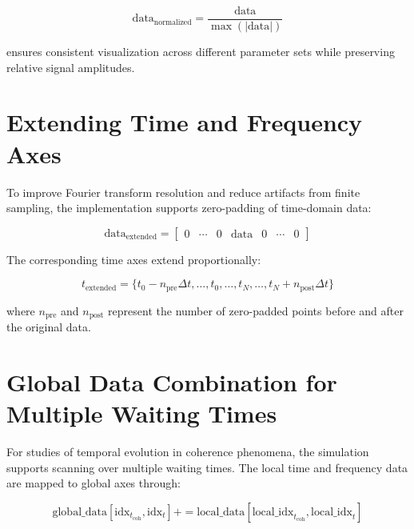 \begin{equation}
	\label{eq:data_normalization}
	\text{data}_{\text{normalized}} = \frac{\text{data}}{\max(|\text{data}|)}
\end{equation}

\noindent
ensures consistent visualization across different parameter sets while preserving relative signal amplitudes.

\section{Extending Time and Frequency Axes}
\label{sec:extending_axes}

\noindent
To improve Fourier transform resolution and reduce artifacts from finite sampling, the implementation supports zero-padding of time-domain data:

\begin{equation}
	\label{eq:zero_padding_matrix}
	\text{data}_{\text{extended}} = \begin{bmatrix}
		0 & \cdots & 0 & \text{data} & 0 & \cdots & 0
	\end{bmatrix}
\end{equation}

\noindent
The corresponding time axes extend proportionally:

\begin{equation}
	\label{eq:extended_time_axis}
	t_{\text{extended}} = \{t_0 - n_{\text{pre}} \Delta t, \ldots, t_0, \ldots, t_N, \ldots, t_N + n_{\text{post}} \Delta t\}
\end{equation}

\noindent
where $n_{\text{pre}}$ and $n_{\text{post}}$ represent the number of zero-padded points before and after the original data.

\section{Global Data Combination for Multiple Waiting Times}
\label{sec:global_data_combination}

\noindent
For studies of temporal evolution in coherence phenomena, the simulation supports scanning over multiple waiting times. The local time and frequency data are mapped to global axes through:

\begin{equation}
	\label{eq:global_mapping_corrected}
	\mathrm{global\_data}[\mathrm{idx}_{t_{\mathrm{coh}}}, \mathrm{idx}_{t}] += \mathrm{local\_data}[\mathrm{local\_idx}_{t_{\mathrm{coh}}}, \mathrm{local\_idx}_{t}]
\end{equation}

